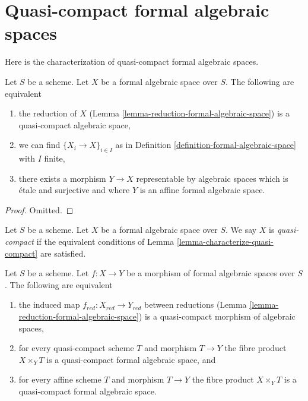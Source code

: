 \section{Quasi-compact formal algebraic spaces}
\label{section-quasi-compact}

\noindent
Here is the characterization of quasi-compact formal algebraic
spaces.

\begin{lemma}
\label{lemma-characterize-quasi-compact}
Let $S$ be a scheme. Let $X$ be a formal algebraic space over $S$.
The following are equivalent
\begin{enumerate}
\item the reduction of $X$
(Lemma \ref{lemma-reduction-formal-algebraic-space}) is a quasi-compact
algebraic space,
\item we can find $\{X_i \to X\}_{i \in I}$ as in
Definition \ref{definition-formal-algebraic-space} with $I$ finite,
\item there exists a morphism $Y \to X$ representable by algebraic
spaces which is \'etale and surjective and where
$Y$ is an affine formal algebraic space.
\end{enumerate}
\end{lemma}

\begin{proof}
Omitted.
\end{proof}

\begin{definition}
\label{definition-quasi-compact}
Let $S$ be a scheme. Let $X$ be a formal algebraic space over $S$.
We say $X$ is {\it quasi-compact} if the equivalent conditions of
Lemma \ref{lemma-characterize-quasi-compact} are satisfied.
\end{definition}

\begin{lemma}
\label{lemma-characterize-quasi-compact-morphism}
Let $S$ be a scheme. Let $f : X \to Y$ be a morphism of formal algebraic
spaces over $S$. The following are equivalent
\begin{enumerate}
\item the induced map $f_{red} : X_{red} \to Y_{red}$ between reductions
(Lemma \ref{lemma-reduction-formal-algebraic-space}) is a quasi-compact
morphism of algebraic spaces,
\item for every quasi-compact scheme $T$ and morphism $T \to Y$
the fibre product $X \times_Y T$ is a quasi-compact formal
algebraic space, and
\item for every affine scheme $T$ and morphism $T \to Y$
the fibre product $X \times_Y T$ is a quasi-compact formal
algebraic space.
\end{enumerate}
\end{lemma}

